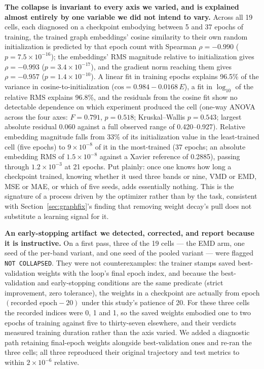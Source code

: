 \documentclass[journal]{IEEEtran}
\begin{document}
\textbf{The collapse is invariant to every axis we varied, and is explained almost
entirely by one variable we did not intend to vary.} Across all 19 cells, each diagnosed on a checkpoint embodying between 5 and 37
epochs of training, the trained graph embeddings' cosine similarity to their own
random initialization is predicted by that epoch count with Spearman
$\rho = -0.990$ ($p = 7.5\times10^{-16}$); the embeddings' RMS magnitude relative
to initialization gives $\rho = -0.993$ ($p = 3.4\times10^{-17}$), and the
gradient norm reaching them gives $\rho = -0.957$ ($p = 1.4\times10^{-10}$). A
linear fit in training epochs explains 96.5\% of the variance in
cosine-to-initialization ($\mathrm{cos} = 0.984 - 0.0168\,E$), a fit in
$\log_{10}$ of the relative RMS explains 96.8\%, and the residuals from the
cosine fit show no detectable dependence on which experiment produced the cell
(one-way ANOVA across the four axes: $F = 0.791$, $p = 0.518$; Kruskal--Wallis
$p = 0.543$; largest absolute residual 0.060 against a full observed range of
0.420--0.927). Relative embedding magnitude falls from 33\% of its
initialization value in the least-trained cell (five epochs) to
$9\times10^{-8}$ of it in the most-trained (37 epochs; an absolute embedding RMS
of $1.5\times10^{-8}$ against a Xavier reference of 0.2885), passing through
$1.2\times10^{-3}$ at 21 epochs. Put plainly: once one knows how long a checkpoint trained,
knowing whether it used three bands or nine, VMD or EMD, MSE or MAE, or which of
five seeds, adds essentially nothing. This is the signature of a process driven by
the optimizer rather than by the task, consistent with Section~\ref{sec:graphfix}'s
finding that removing weight decay's pull does not substitute a learning signal
for it.

\textbf{An early-stopping artifact we detected, corrected, and report because it
is instructive.} On a first pass, three of the 19 cells --- the EMD arm, one seed
of the per-band variant, and one seed of the pooled variant --- were flagged
\texttt{NOT COLLAPSED}. They were not counterexamples: the trainer stamps saved
best-validation weights with the loop's final epoch index, and because the
best-validation and early-stopping conditions are the same predicate (strict
improvement, zero tolerance), the weights in a checkpoint are actually from epoch
$(\text{recorded epoch} - 20)$ under this study's patience of 20. For these three
cells the recorded indices were 0, 1 and 1, so the saved weights embodied one to
two epochs of training against five to thirty-seven elsewhere, and their verdicts
measured training duration rather than the axis varied. We added a diagnostic
path retaining final-epoch weights alongside best-validation ones and re-ran the
three cells; all three reproduced their original trajectory and test metrics to
within $2\times10^{-6}$ relative.
\end{document}
